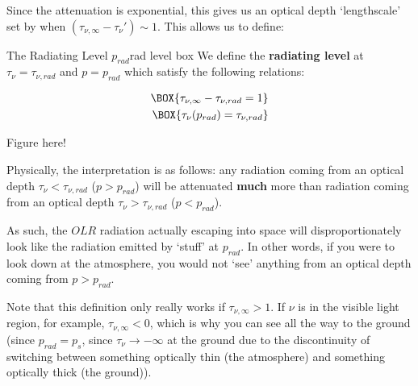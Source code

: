 Since the attenuation is exponential, this gives us an optical depth `lengthscale' set by when $(\tau_{\nu,\infty}-\tau_\nu')\sim 1$. This allows us to define:
\begin{fact}{The Radiating Level $p_{rad}$}{rad level box}\label{rad level box}
    We define the \textbf{radiating level} at $\tau_\nu=\tau_{\nu,rad}$ and $p=p_{rad}$ which satisfy the following relations:

    \begin{minipage}{.5\linewidth}
    \begin{align}
        \BOX{\tau_{\nu,\infty}-\tau_{\nu,rad} = 1}\\
        \BOX{\tau_\nu(p_{rad})=\tau_{\nu,rad}}
    \end{align}
    \end{minipage}
    \begin{minipage}{.5\linewidth}
        Figure here!
    \end{minipage}

    Physically, the interpretation is as follows: any radiation coming from an optical depth $\tau_\nu<\tau_{\nu,rad}$ ($p>p_{rad}$) will be attenuated \textbf{much} more than radiation coming from an optical depth $\tau_\nu>\tau_{\nu,rad}$ ($p<p_{rad}$).

    As such, the $OLR$ radiation actually escaping into space will disproportionately look like the radiation emitted by `stuff' at $p_{rad}$. In other words, if you were to look down at the atmosphere, you would not `see' anything from an optical depth coming from $p>p_{rad}$. 
\end{fact}
Note that this definition only really works if $\tau_{\nu,\infty}>1$. If $\nu$ is in the visible light region, for example, $\tau_{\nu,\infty}<0$, which is why you can see all the way to the ground (since $p_{rad}=p_s$, since $\tau_\nu\to-\infty$ at the ground due to the discontinuity of switching between something optically thin (the atmosphere) and something optically thick (the ground)).

